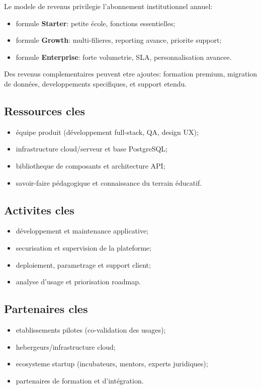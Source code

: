 \documentclass[12pt,a4paper,oneside]{report}
\begin{document}
Le modele de revenus privilegie l'abonnement institutionnel annuel:
\begin{itemize}
  \item formule \textbf{Starter}: petite école, fonctions essentielles;
  \item formule \textbf{Growth}: multi-filieres, reporting avance, priorite support;
  \item formule \textbf{Enterprise}: forte volumetrie, SLA, personnalisation avancee.
\end{itemize}

Des revenus complementaires peuvent etre ajoutes: formation premium, migration de données, developpements specifiques, et support etendu.

\subsection{Ressources cles}

\begin{itemize}
  \item équipe produit (développement full-stack, QA, design UX);
  \item infrastructure cloud/serveur et base PostgreSQL;
  \item bibliotheque de composants et architecture API;
  \item savoir-faire pédagogique et connaissance du terrain éducatif.
\end{itemize}

\subsection{Activites cles}

\begin{itemize}
  \item développement et maintenance applicative;
  \item securisation et supervision de la plateforme;
  \item deploiement, parametrage et support client;
  \item analyse d'usage et priorisation roadmap.
\end{itemize}

\subsection{Partenaires cles}

\begin{itemize}
  \item etablissements pilotes (co-validation des usages);
  \item hebergeurs/infrastructure cloud;
  \item ecosysteme startup (incubateurs, mentors, experts juridiques);
  \item partenaires de formation et d'intégration.
\end{itemize}
\end{document}
